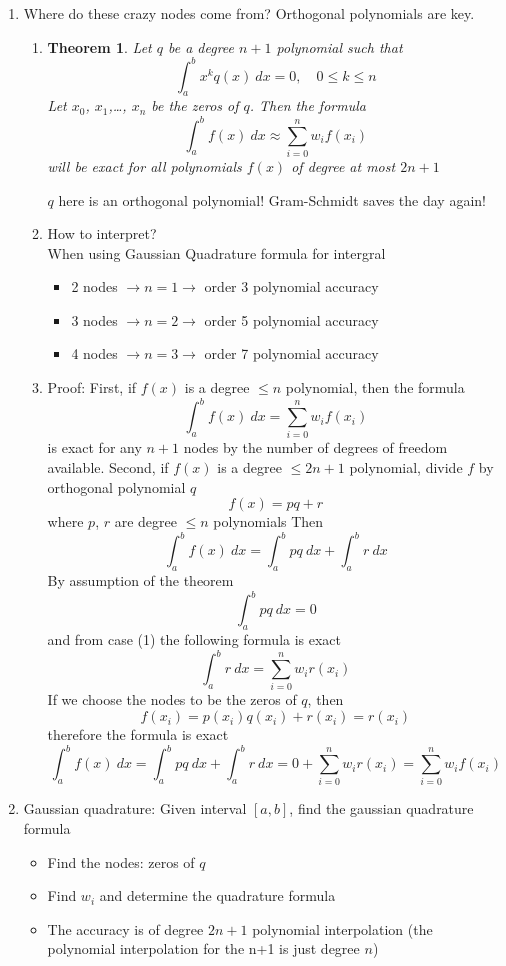 \documentclass{article}
\newtheorem{thm}{Theorem}[section]
\theoremstyle{remark}
\begin{document}
\begin{enumerate}
\item Where do these crazy nodes come from? Orthogonal polynomials are key.
\begin{enumerate}
\item
\begin{thm}
Let $q$ be  a degree $n+1$ polynomial such that
$$
\int_a^bx^kq(x)~dx = 0,\quad 0\leq k\leq n
$$
Let $x_0$, $x_1$,\dots, $x_n$ be the zeros of $q$. Then the formula 
$$
\int_a^bf(x)~dx \approx \sum_{i=0}^nw_if(x_i) 
$$
will be exact for all polynomials $f(x)$ of degree at most $2n+1$
\end{thm}
$q$ here is an orthogonal polynomial! Gram-Schmidt saves the day again!

\item How to interpret? \\ 
When using Gaussian Quadrature formula for intergral
\begin{itemize}
\item 2 nodes $\rightarrow n=1\rightarrow$ order 3 polynomial accuracy
\item 3 nodes $\rightarrow n=2\rightarrow$ order 5 polynomial accuracy
\item 4 nodes $\rightarrow n=3\rightarrow$ order 7 polynomial accuracy
\end{itemize}

\item Proof:
First, if $f(x)$ is a degree $\leq n$ polynomial, then the formula
$$
\int_a^bf(x)~dx = \sum_{i=0}^nw_if(x_i) 
$$
is exact for any $n+1$ nodes by the number of degrees of freedom available. 
Second, if $f(x)$ is a degree $\leq 2n+1$ polynomial, divide $f$ by orthogonal polynomial $q$
$$
f(x) = pq+r
$$
where $p$, $r$ are degree $\leq n$ polynomials
Then 
$$
\int_a^bf(x)~dx = \int_a^b pq~dx + \int_a^b r~dx
$$
By assumption of the theorem
$$
\int_a^b pq~dx = 0
$$
and from case (1) the following formula is exact
$$
\int_a^b r~dx = \sum_{i=0}^n w_ir(x_i)
$$
If we choose the nodes to be the zeros of $q$, then
$$
f(x_i) = p(x_i)q(x_i)+ r(x_i) = r(x_i)
$$
therefore the formula is exact
$$
\int_a^bf(x)~dx = \int_a^b pq~dx + \int_a^b r~dx = 0 + \sum_{i=0}^n w_ir(x_i) = \sum_{i=0}^n w_if(x_i)
$$
\end{enumerate}

\item Gaussian quadrature:
Given interval $[a,b]$, find the gaussian quadrature formula
\begin{itemize}
\item Find the nodes: zeros of $q$
\item Find $w_i$ and determine the quadrature formula
\item The accuracy is of degree $2n+1$ polynomial interpolation (the polynomial interpolation for the n+1 is just degree $n$)
\end{itemize}


\end{enumerate}
\end{document}
